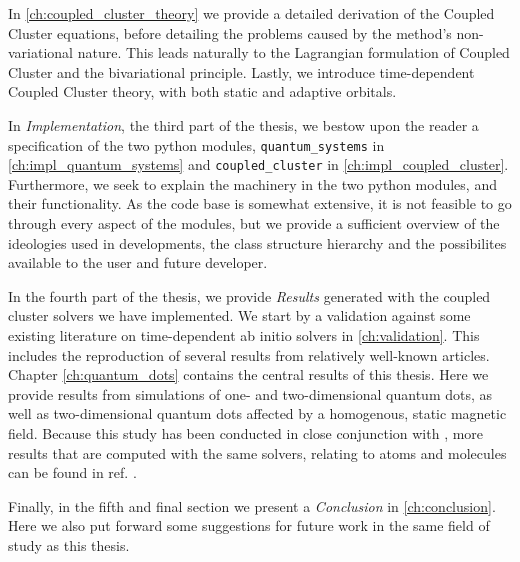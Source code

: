     In \autoref{ch:coupled_cluster_theory}
    we provide a detailed derivation
    of the Coupled Cluster equations, before detailing the problems caused 
    by the method's non-variational nature. This leads naturally to 
    the Lagrangian formulation of Coupled Cluster\cite{helgaker1988analytical}
    and the bivariational principle\cite{arponen1983variational}. Lastly,
    we introduce time-dependent Coupled Cluster theory, with both static and 
    adaptive orbitals\cite{kvaal2012ab}.

    In \emph{Implementation}, the third part of the thesis, we bestow upon the reader 
    a specification of the two python modules, \lstinline{quantum_systems} in 
    \autoref{ch:impl_quantum_systems}
    and \lstinline{coupled_cluster} in \autoref{ch:impl_coupled_cluster}.
    Furthermore, we seek to explain the machinery
    in the two python modules, and their functionality. As the code base is somewhat 
    extensive, it is not feasible to go through every aspect of the modules, but we 
    provide a sufficient overview of the ideologies used in developments, the class
    structure hierarchy and the possibilites available to the user and future developer.

    In the fourth part of the thesis, we provide \emph{Results} generated with the
    coupled cluster solvers we have implemented. We start by a validation against
    some existing literature on time-dependent ab initio solvers in \autoref{ch:validation}.
    This includes 
    the reproduction of several results from relatively well-known articles. 
    Chapter \ref{ch:quantum_dots} contains the central results of 
    this thesis. Here we provide results from simulations of one- and two-dimensional 
    quantum dots, as well as two-dimensional quantum 
    dots affected by a homogenous, static magnetic field. Because this study 
    has been conducted in close conjunction with
    \citeauthor{islandwind2019}, more results that are computed with the 
    same solvers, relating to atoms and molecules can be found in ref.
    \cite{islandwind2019}.
   
    Finally, in the fifth and final section we present a \emph{Conclusion} 
    in \autoref{ch:conclusion}. Here we also put forward
    some suggestions for future work in the same field of study as this thesis.

    \clearemptydoublepage